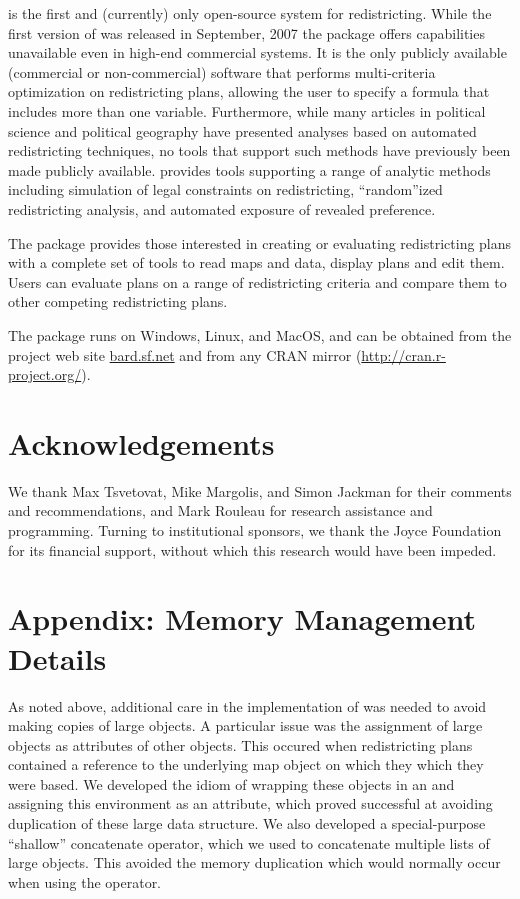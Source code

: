 \documentclass[article]{JSSstyle/jss}
\begin{document}
 is the first and (currently) only open-source system for redistricting. While 
the first version of  was released in September, 2007 the package offers capabilities 
unavailable even in high-end commercial systems.  It is the only publicly available (commercial or non-commercial) 
software that performs multi-criteria optimization on redistricting plans, allowing the user to specify a 
formula that includes more than one variable.  Furthermore, while many articles in political science and political geography have 
presented analyses based on automated redistricting techniques, no tools  that support such methods have previously been 
 made publicly available.   provides tools 
supporting a range of analytic methods including simulation of legal constraints on redistricting, ``random''ized 
redistricting analysis, and automated exposure of revealed preference. 

The  package provides those interested in creating or evaluating redistricting 
plans with a complete set of tools to read maps and data, display plans and edit them. Users can evaluate plans 
on a range of redistricting criteria and compare them to other competing redistricting plans. 

The  package runs on Windows, Linux, and MacOS, and can be obtained from the project 
web site \url{bard.sf.net} and from any  CRAN mirror (\url{http://cran.r-project.org/}). 

\section{Acknowledgements}\vspace{-5pt}

We thank Max Tsvetovat, Mike Margolis, and Simon Jackman for their comments and recommendations, 
and Mark Rouleau for research assistance and programming.  Turning to institutional 
sponsors, we thank the Joyce Foundation for its financial support, without which 
this research would have been impeded. 

\section{Appendix: Memory Management Details}

As noted above, additional care in the implementation of  was needed to avoid making copies of large objects. A particular issue was the assignment of  large objects as attributes of other objects. This occured when redistricting plans contained a reference to the underlying map object on which they which they were based.  We 
developed the idiom of wrapping these objects in an  and 
assigning this environment as an attribute, which proved successful at avoiding 
duplication of these large data structure.  We also developed a special-purpose ``shallow'' concatenate operator, which we used to concatenate multiple lists of large objects. This avoided the memory duplication which would normally occur when using the  operator.
\end{document}
